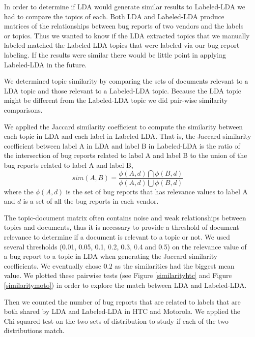 \documentclass[10pt, conference, compsocconf]{IEEEtran}
\begin{document}
In order to determine if LDA would generate similar results to
Labeled-LDA we had to compare the topics of each.
Both LDA and Labeled-LDA produce matrices of
 the relationships between bug reports of two vendors and the
labels or topics.
Thus we wanted to know if the LDA extracted topics that we manually
labeled matched the Labeled-LDA topics that were labeled via our bug
report labeling. If the results were similar there would be little
point in applying Labeled-LDA in the future.

We determined topic similarity by comparing the sets of documents
relevant to a LDA topic and those relevant to a Labeled-LDA
topic. Because the LDA topic might be different from the Labeled-LDA
topic we did pair-wise similarity comparisons.

We applied the Jaccard similarity coefficient to compute the
similarity between each topic in LDA and each label in Labeled-LDA. 
That is, the Jaccard similarity coefficient between label A in LDA and
label B in Labeled-LDA is the ratio of the intersection of bug reports
related to label A and label B to the union of the bug reports related
to label A and label B,
\begin{equation}
sim(A,B) = \frac{\phi(A,d)\bigcap\phi(B,d)}{\phi(A,d)\bigcup\phi(B,d)}
\end{equation}
where the $\phi(A,d)$ is the set of bug reports that has relevance
values to label A and $d$ is a set of all the bug reports in each
vendor.

The topic-document matrix often contains noise and weak
relationships between topics and documents, thus it is necessary to
provide a threshold of document relevance to determine if a document
is relevant to a topic or not.
We used several thresholds (0.01, 0.05, 0.1, 0.2, 0.3, 0.4 and 0.5) on
the relevance value of a bug report to a topic in LDA when generating
the Jaccard similarity coefficients. 
We eventually chose $0.2$ as the similarities had the biggest mean
value. 
We plotted these pairwise tests (see Figure \ref{similarityhtc} and
Figure \ref{similaritymoto}) in order to explore the match between
LDA and Labeled-LDA.

Then we counted the number of bug reports that are related to labels
that are both shared by LDA and Labeled-LDA in HTC and Motorola. 
We applied the Chi-squared test on the two sets of distribution to
study if each of the two distributions match.
\end{document}
